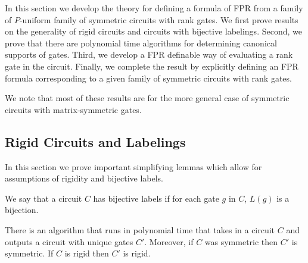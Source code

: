 \documentclass[../paper.tex]{subfiles}
\begin{document}
In this section we develop the theory for defining a formula of FPR from a
family of $P$-uniform family of symmetric circuits with rank gates. We first
prove results on the generality of rigid circuits and circuits with bijective
labelings. Second, we prove that there are polynomial time algorithms for
determining canonical supports of gates. Third, we develop a FPR definable way
of evaluating a rank gate in the circuit. Finally, we complete the result by
explicitly defining an FPR formula corresponding to a given family of symmetric
circuits with rank gates.

We note that most of these results are for the more general case of symmetric
circuits with matrix-symmetric gates.


\subsection{Rigid Circuits and Labelings}

In this section we prove important simplifying lemmas which allow for
assumptions of rigidity and bijective labels.

\begin{definition}
  We say that a circuit $C$ has bijective labels if for each gate $g$ in $C$,
  $L(g)$ is a bijection.
\end{definition}

\begin{lem}
  \label{lem:bij_labels}
  There is an algorithm that runs in polynomial time that takes in a circuit $C$
  and outputs a circuit with unique gates $C'$. Moreover, if $C$ was symmetric
  then $C'$ is symmetric. If $C$ is rigid then $C'$ is rigid.
\end{lem}
\end{document}
